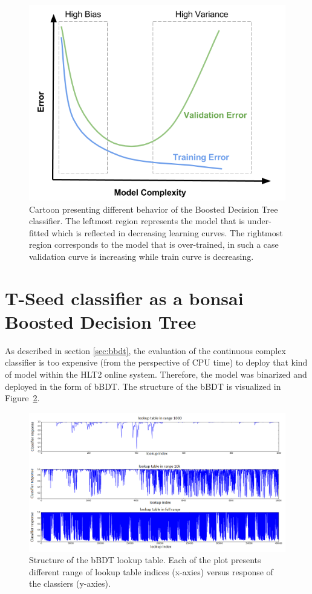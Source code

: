 \begin{figure}
\centering
\includegraphics[scale=0.6]{figures/bbdt_overfitting.png}
\caption{Cartoon presenting different behavior of the Boosted Decision Tree classifier. The leftmost region represents the model that is under-fitted which is reflected in decreasing learning curves. The rightmost region corresponds to the model that is over-trained, in such a case validation curve is increasing while train curve is decreasing. }
\label{fig:xgboost_overfitting}
\end{figure}

\section{T-Seed classifier as a bonsai Boosted Decision Tree }

As described in section \ref{sec:bbdt}, the evaluation of the continuous complex classifier is too expensive (from the perspective of CPU time) to deploy that kind of model within the HLT2 online system. Therefore, the model was binarized and deployed in the form of bBDT. The structure of the bBDT is visualized in Figure~\ref{fig:bbt_structure}. 

\begin{figure}[h]
\centering
\hspace*{-1cm}\includegraphics{figures/BBDT_lookup.png}
\caption{Structure of the bBDT lookup table. Each of the plot presents different range of lookup table indices (x-axies) versus response of the classiers (y-axies).}
\label{fig:bbt_structure}
\end{figure}

